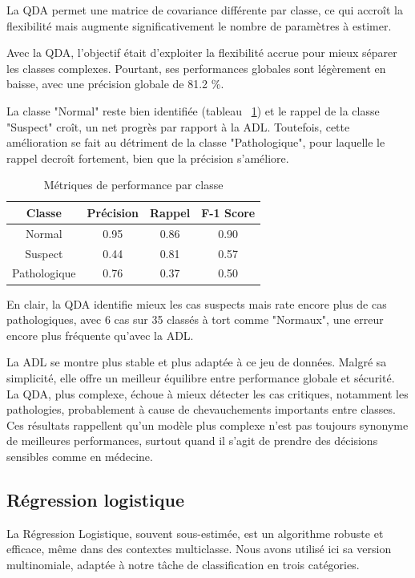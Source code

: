\documentclass[twocolumn,10pt]{article}
\begin{document}
La QDA permet une matrice de covariance différente par classe, ce qui accroît la flexibilité mais augmente significativement le nombre de paramètres à estimer.

Avec la QDA, l’objectif était d’exploiter la flexibilité accrue pour mieux séparer les classes complexes. Pourtant, ses performances globales sont légèrement en baisse, avec une précision globale de 81.2 \%.

La classe "Normal" reste bien identifiée (tableau ~\ref{tab:perf2}) et le rappel de la classe "Suspect" croît, un net progrès par rapport à la ADL. Toutefois, cette amélioration se fait au détriment de la classe "Pathologique", pour laquelle le rappel decroît fortement, bien que la précision s'améliore.

\begin{table}[htbp]
\centering
\caption{\label{tab:perf2}Métriques de performance par classe}
\begin{tabular}{cccc}
\toprule
Classe & Précision & Rappel & F-1 Score \\
\midrule
Normal & 0.95 & 0.86 & 0.90 \\
Suspect & 0.44 & 0.81 & 0.57 \\
Pathologique & 0.76 & 0.37 & 0.50 \\
\bottomrule
\end{tabular}
\end{table}

En clair, la QDA identifie mieux les cas suspects mais rate encore plus de cas pathologiques, avec 6 cas sur 35 classés à tort comme "Normaux", une erreur encore plus fréquente qu’avec la ADL.

La ADL se montre plus stable et plus adaptée à ce jeu de données. Malgré sa simplicité, elle offre un meilleur équilibre entre performance globale et sécurité. La QDA, plus complexe, échoue à mieux détecter les cas critiques, notamment les pathologies, probablement à cause de chevauchements importants entre classes. Ces résultats rappellent qu’un modèle plus complexe n’est pas toujours synonyme de meilleures performances, surtout quand il s’agit de prendre des décisions sensibles comme en médecine.

\subsection{Régression logistique}\label{subsec:sup:reg_log}
La Régression Logistique, souvent sous-estimée, est un algorithme robuste et efficace, même dans des contextes multiclasse. Nous avons utilisé ici sa version multinomiale, adaptée à notre tâche de classification en trois catégories.
\end{document}
